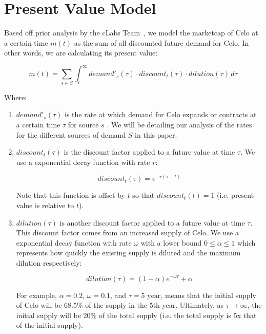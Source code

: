 
\section{Present Value Model}

Based off prior analysis by the cLabs Team~\cite{celo}, we model the marketcap of Celo at a certain time $m(t)$ as the sum of all discounted future demand for Celo. 
In other words, we are calculating its present value:

\begin{equation}
    m(t) = \sum_{s\in S}{\int_{t}^{\infty} demand'_s(\tau) \cdot discount_t(\tau) \cdot dilution(\tau) \,d\tau}
\end{equation}

Where:

\begin{enumerate}[label=(\roman*)]
	\item $demand'_s(\tau)$ is the rate at which demand for Celo expands or contracts at a certain time $\tau$ for source $s$ . 
    We will be detailing our analysis of the rates for the different sources of demand $S$ in this paper.

	\item $discount_t(\tau)$ is the discount factor applied to a future value at time $\tau$. We use a exponential decay function with rate $r$:
    
    \begin{equation}
        discount_t(\tau) = e^{-r(\tau-t)}  
    \end{equation}

    Note that this function is offset by $t$ so that $discount_t(t)=1$ (i.e. present value is relative to $t$).

	\item $dilution(\tau)$ is another discount factor applied to a future value at time $\tau$. This discount factor comes from an increased supply of Celo.
	We use a exponential decay function with rate $\omega$ with a lower bound $0 \leq \alpha \leq 1$ which represents how quickly the existing supply is diluted and 
    the maximum dilution respectively:
    
    \begin{equation}
        dilution(\tau) = (1-\alpha)e^{-\omega\tau} + \alpha
    \end{equation}

    For example, $\alpha=0.2$, $\omega=0.1$, and $\tau=5\textrm{ year}$, means that the initial supply of Celo will be 68.5\% of the supply in the 5th year. Ultimately, as 
    $\tau \to \infty$, the initial supply will be 20\% of the total supply (i.e. the total supply is 5x that of the initial supply).
\end{enumerate}

